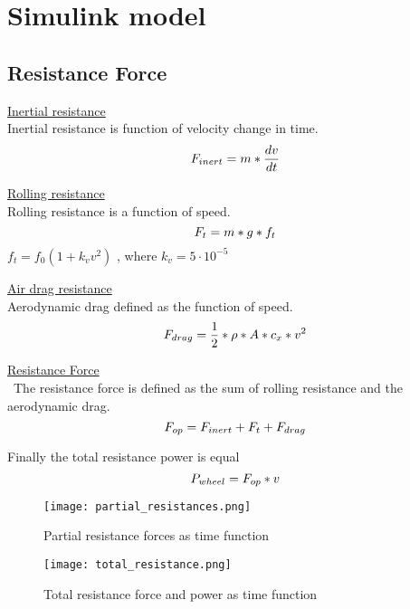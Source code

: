 \documentclass[a4paper,14pt,twoside]{extreport}
\begin{document}
\chapter{Simulink model}
\section{Resistance Force}
\begin{center}
\underline{Inertial resistance} \\
Inertial resistance is function of velocity change in time.\\
\begin{equation}
\large{ F_{inert} = m *\frac{dv}{dt} }
\end{equation}


\underline{Rolling resistance} \\
Rolling resistance is a function of speed. \\
\begin{equation}
\large{F_t = m*g*f_t}
\end{equation}
$f_t = f_0(1+k_vv^2)$ , where $k_v = 5 \cdot 10^{-5}$

\normalsize
\bigskip
\underline{Air drag resistance} \\
Aerodynamic drag defined as the function of speed. \\
\begin{equation}
\large{F_{drag} = \frac{1}{2}*\rho*A*c_x*v^2}
\end{equation}

\normalsize
\bigskip
\underline{Resistance Force} \\\
The resistance force is defined as the sum of rolling resistance and the aerodynamic drag.\\
\begin{equation}
\large{F_{op} = F_{inert} + F_t + F_{drag} }
\end{equation}

\normalsize
\bigskip
Finally the total resistance power is equal
\begin{equation}
\large{P_{wheel} = F_{op}*v }
\end{equation}
\end{center}

\begin{figure}[H]
  \centerline{\texttt{[image: partial\_resistances.png]}} 
  \caption{Partial resistance forces as time function}
\end{figure}


\begin{figure}[H]
  \centerline{\texttt{[image: total\_resistance.png]}} 
  \caption{Total resistance force and power as time function}
\end{figure}
\end{document}
